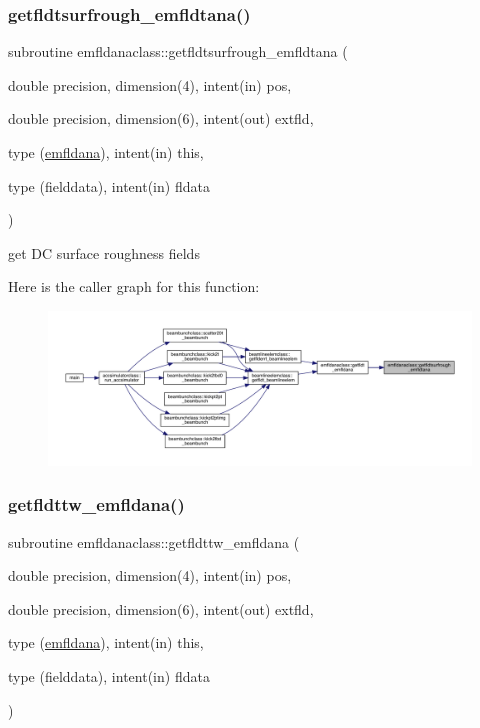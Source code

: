\subsubsection{\texorpdfstring{getfldtsurfrough\_emfldtana()}{getfldtsurfrough\_emfldtana()}}
{\footnotesize\ttfamily subroutine emfldanaclass\+::getfldtsurfrough\+\_\+emfldtana (\begin{DoxyParamCaption}\item[{double precision, dimension(4), intent(in)}]{pos,  }\item[{double precision, dimension(6), intent(out)}]{extfld,  }\item[{type (\mbox{\hyperlink{namespaceemfldanaclass_structemfldanaclass_1_1emfldana}{emfldana}}), intent(in)}]{this,  }\item[{type (fielddata), intent(in)}]{fldata }\end{DoxyParamCaption})}



get DC surface roughness fields 

Here is the caller graph for this function\+:\nopagebreak
\begin{figure}[H]
\begin{center}
\leavevmode
\includegraphics[width=350pt]{namespaceemfldanaclass_ac3c4c5ce44722c1aa2ba2d10700e0215_icgraph}
\end{center}
\end{figure}
\mbox{\label{namespaceemfldanaclass_a49f218450fbccc7099479730313a5ec1}} 
\subsubsection{\texorpdfstring{getfldttw\_emfldana()}{getfldttw\_emfldana()}}
{\footnotesize\ttfamily subroutine emfldanaclass\+::getfldttw\+\_\+emfldana (\begin{DoxyParamCaption}\item[{double precision, dimension(4), intent(in)}]{pos,  }\item[{double precision, dimension(6), intent(out)}]{extfld,  }\item[{type (\mbox{\hyperlink{namespaceemfldanaclass_structemfldanaclass_1_1emfldana}{emfldana}}), intent(in)}]{this,  }\item[{type (fielddata), intent(in)}]{fldata }\end{DoxyParamCaption})}




